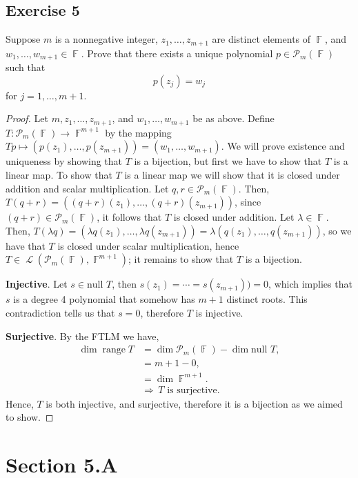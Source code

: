 \documentclass[letterpaper, 12pt]{amsart}
\DeclareMathOperator{\F}{\mathbb{F}}				%
\DeclareMathOperator{\Ell}{\mathscr{L}}				%
\renewcommand{\null}{\text{null }}					%
\DeclareMathOperator{\range}{\text{range }}			%
\theoremstyle{definition}  							%
\newcommand{\Ra}{\Rightarrow}                   %
\begin{document}
		\subsection*{Exercise 5}
		Suppose $m$ is a nonnegative integer, $z_{1}, \dots, z_{m+1}$ are distinct elements of $\F$, and $w_{1}, \dots, w_{m+1} \in \F$.
		Prove that there exists a unique polynomial $p \in \mathcal{P}_{m}(\F)$ such that $$p(z_{j}) = w_{j}$$ for $j = 1, \dots, m+1$.

		\begin{proof}
		Let $m, z_{1}, \dots, z_{m+1}$, and $w_{1}, \dots, w_{m+1}$ be as above.
		Define $T : \mathcal{P}_{m}(\F) \to \F^{m+1}$ by the mapping $Tp \mapsto (p(z_{1}), \dots, p(z_{m+1})) = (w_{1}, \dots, w_{m+1})$.
		We will prove existence and uniqueness by showing that $T$ is a bijection, but first we have to show that $T$ is a linear map.
		To show that $T$ is a linear map we will show that it is closed under addition and scalar multiplication.
		Let $q,r \in \mathcal{P}_{m}(\F)$.
		Then, $T(q+r) = ((q+r)(z_{1}), \dots, (q+r)(z_{m+1}))$, since $(q+r) \in \mathcal{P}_{m}(\F)$, it follows that $T$ is closed under addition.
		Let $\lambda \in \F$.
		Then, $T(\lambda q) = (\lambda q(z_{1}), \dots, \lambda q(z_{m+1})) = \lambda (q(z_{1}), \dots, q(z_{m+1}))$, so we have that $T$ is closed under scalar multiplication, hence $T \in \Ell(\mathcal{P}_{m}(\F), \F^{m+1})$; it remains to show that $T$ is a bijection.

		\textbf{Injective}.
		Let $s \in \null T$, then $s(z_{1}) = \cdots = s(z_{m+1})) = 0$, which implies that $s$ is a degree 4 polynomial that somehow has $m+1$ distinct roots.
		This contradiction tells us that $s = 0$, therefore $T$ is injective.

		\textbf{Surjective}.
		By the FTLM we have,
		\begin{align*}
			\dim \range T &= \dim \mathcal{P}_{m}(\F) - \dim \null T, \\
			&= m + 1 - 0, \\
			&= \dim \F^{m+1}. \\
			&\Ra \, \text{$T$ is surjective}.
		\end{align*}
		Hence, $T$ is both injective, and surjective, therefore it is a bijection as we aimed to show.
		
		\end{proof}

	\section*{Section 5.A}
\end{document}
